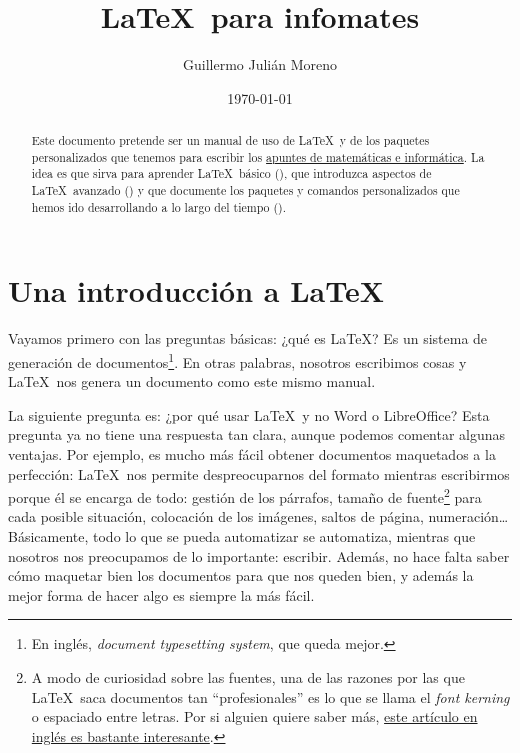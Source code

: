 \documentclass[palatino]{apuntes}
\author{Guillermo Julián Moreno}
\date{\today}
\title{\LaTeX\ para infomates}
\begin{document}
\begin{abstract}
Este documento pretende ser un manual de uso de \LaTeX\ y de los paquetes personalizados que tenemos para escribir los \href{http://github.com/VicdeJuan/Apuntes}{apuntes de matemáticas e informática}.  La idea es que sirva para aprender \LaTeX\ básico (), que introduzca aspectos de \LaTeX\ avanzado () y que documente los paquetes y comandos personalizados que hemos ido desarrollando a lo largo del tiempo ().
\end{abstract}

\pagestyle{plain}
\maketitle

\newpage

\tableofcontents


\chapter{Una introducción a \LaTeX}
\label{chap:Introduccion}

Vayamos primero con las preguntas básicas: ¿qué es \LaTeX? Es un sistema de generación de documentos\footnote{En inglés, \textit{document typesetting system}, que queda mejor.}. En otras palabras, nosotros escribimos cosas y \LaTeX\ nos genera un documento como este mismo manual.

La siguiente pregunta es: ¿por qué usar \LaTeX\ y no Word o LibreOffice? Esta pregunta ya no tiene una respuesta tan clara, aunque podemos comentar algunas ventajas. Por ejemplo, es mucho más fácil obtener documentos maquetados a la perfección: \LaTeX\ nos permite despreocuparnos del formato mientras escribirmos porque él se encarga de todo: gestión de los párrafos, tamaño de fuente\footnote{A modo de curiosidad sobre las fuentes, una de las razones por las que \LaTeX\ saca documentos tan ``profesionales'' es lo que se llama el \textit{font kerning} o espaciado entre letras. Por si alguien quiere saber más, \href{http://nitens.org/taraborelli/latex}{este artículo en inglés es bastante interesante}.} para cada posible situación, colocación de los imágenes, saltos de página, numeración\ldots Básicamente, todo lo que se pueda automatizar se automatiza, mientras que nosotros nos preocupamos de lo importante: escribir. Además, no hace falta saber cómo maquetar bien los documentos para que nos queden bien, y además la mejor forma de hacer algo es siempre la más fácil.
\end{document}
